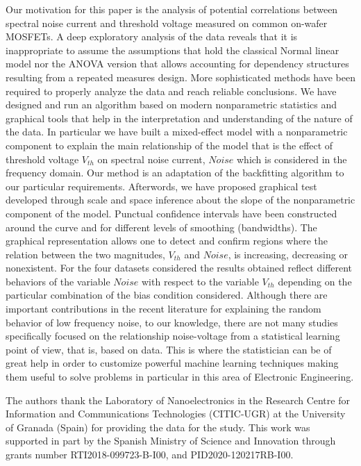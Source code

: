 \documentclass[sn-mathphys]{sn-jnl}%
\theoremstyle{thmstyleone}%
\theoremstyle{thmstyletwo}%
\theoremstyle{thmstylethree}%
\begin{document}
Our motivation for this paper is the analysis of potential correlations between spectral noise current and threshold voltage measured on common on-wafer MOSFETs. A deep exploratory analysis of the data reveals that it is inappropriate to assume the assumptions that hold the classical Normal linear model nor the ANOVA version that allows accounting for dependency structures resulting from a repeated measures design. More sophisticated methods have been required to properly analyze the data and reach reliable conclusions.
We have designed and run an algorithm based on modern nonparametric statistics and graphical tools that help in the interpretation and understanding of the nature of the data. In particular we have built a mixed-effect model with a nonparametric component to explain the main relationship of the model that is the effect of threshold voltage $V_{th}$ on spectral noise current, $Noise$ which is considered in the frequency domain. Our method is an adaptation of the backfitting algorithm to our particular requirements. Afterwords, we have proposed 
graphical test developed through scale and space inference about the slope of the nonparametric component of the model. Punctual  confidence intervals have been constructed around the curve and for different levels of smoothing (bandwidths). The graphical representation allows one to detect and confirm regions where the relation between the two magnitudes, $V_{th}$ and $Noise$, is increasing, decreasing or nonexistent. For the four datasets considered the results obtained reflect different behaviors of the variable $Noise$ with respect to the variable $V_{th}$ depending on the particular combination of the bias condition considered.
Although there are important contributions in the recent literature for explaining the random behavior of low frequency noise, to our knowledge, there are not many studies specifically focused on the relationship noise-voltage from a statistical learning point of view, that is, based on data. This is where the statistician can be of great help in order to customize powerful machine learning techniques making them useful to solve problems in particular in this area of Electronic Engineering.  


The authors thank the Laboratory of Nanoelectronics in the Research Centre for Information and Communications Technologies (CITIC-UGR) at the University of Granada (Spain) for providing the data for the study. This work was supported in part by the Spanish Ministry of Science and Innovation through grants number	RTI2018-099723-B-I00, and PID2020-120217RB-I00.
\end{document}

